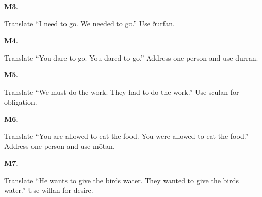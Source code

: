 \par\begin{minipage}{\linewidth}\raggedright
\textbf{M3.}

Translate “I need to go. We needed to go.” Use ðurfan.

\end{minipage}\par\addvspace{4pt}

\par\begin{minipage}{\linewidth}\raggedright
\textbf{M4.}

Translate “You dare to go. You dared to go.” Address one person and use durran.

\end{minipage}\par\addvspace{4pt}

\par\begin{minipage}{\linewidth}\raggedright
\textbf{M5.}

Translate “We must do the work. They had to do the work.” Use sculan for obligation.

\end{minipage}\par\addvspace{4pt}

\par\begin{minipage}{\linewidth}\raggedright
\textbf{M6.}

Translate “You are allowed to eat the food. You were allowed to eat the food.” Address one person and use mōtan.

\end{minipage}\par\addvspace{4pt}

\par\begin{minipage}{\linewidth}\raggedright
\textbf{M7.}

Translate “He wants to give the birds water. They wanted to give the birds water.” Use willan for desire.

\end{minipage}\par\addvspace{4pt}

